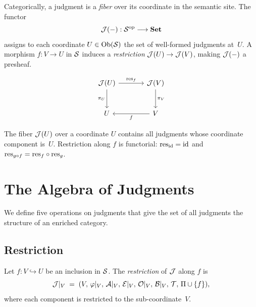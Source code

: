 \documentclass[11pt]{article}
\begin{document}
Categorically, a judgment is a \emph{fiber} over its coordinate in the
semantic site.  The functor
\[
  \mathcal{J}(-) : \mathcal{S}^{\mathrm{op}} \longrightarrow \mathbf{Set}
\]
assigns to each coordinate $U \in \mathrm{Ob}(\mathcal{S})$ the set of well-formed
judgments at~$U$.  A morphism $f : V \to U$ in $\mathcal{S}$ induces a
\emph{restriction} $\mathcal{J}(U) \to \mathcal{J}(V)$, making $\mathcal{J}(-)$ a presheaf.

\begin{equation}\label{eq:fiber}
\begin{tikzcd}[column sep=large, row sep=large]
  \J(U) \arrow[d, "\pi_U"'] \arrow[r, "\res_f"] & \J(V) \arrow[d, "\pi_V"] \\
  U & V \arrow[l, "f"]
\end{tikzcd}
\end{equation}

The fiber $\mathcal{J}(U)$ over a coordinate $U$ contains all judgments whose
coordinate component is~$U$.  Restriction along $f$ is functorial:
$\mathrm{res}_{\mathrm{id}} = \mathrm{id}$ and
$\mathrm{res}_{g \circ f} = \mathrm{res}_f \circ \mathrm{res}_g$.


\section{The Algebra of Judgments}\label{sec:algebra}

We define five operations on judgments that give the set of all judgments
the structure of an enriched category.

\subsection{Restriction}\label{ssec:restriction}

\begin{definition}[Restriction]
Let $f : V \hookrightarrow U$ be an inclusion in $\mathcal{S}$.  The
\emph{restriction} of $\mathcal{J}$ along $f$ is
\[
  \mathcal{J}|_V \;=\; (V,\,\varphi|_V,\,\mathcal{A}|_V,\,\mathcal{E}|_V,\,\mathcal{O}|_V,\,\mathcal{B}|_V,\,\mathcal{T},\,\Pi \cup \{f\}),
\]
where each component is restricted to the sub-coordinate~$V$.
\end{definition}
\end{document}
